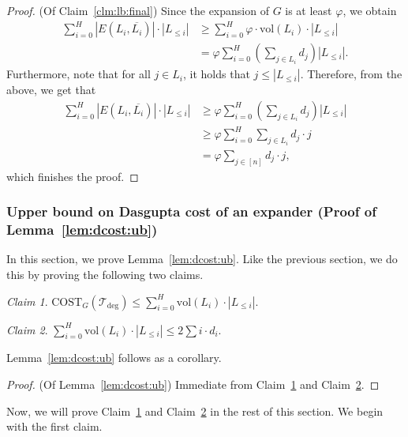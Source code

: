 \documentclass[letterpaper,11pt]{article}
\newcommand{\tdeg}{\mathcal{T}_{\deg}}
\newcommand{\CT}{\text{COST}}
\theoremstyle{plain}
\theoremstyle{definition}
\theoremstyle{remark}
\newtheorem{claim}{Claim}
\newcommand{\vol}{\text{vol}}
\begin{document}
\begin{proof} (Of Claim~\ref{clm:lb:final})
Since the expansion of $G$ is at least $\varphi$, we obtain
	\begin{align*}
		\sum_{i=0}^{H} |E(L_i, \overline{L_i})| \cdot |L_{\leq i}| &\geq \sum_{i=0}^{H} \varphi \cdot \vol(L_i) \cdot |L_{\leq i}| \\
		&=  \varphi \sum_{i=0}^{H} \left( \sum_{j \in L_i} d_j \right) |L_{\leq i}|.
	\end{align*}
Furthermore, note that for all $j \in L_i$, it holds that $j \leq |L_{\leq i}|$. Therefore, from the above, we get that
\begin{align*}
    \sum_{i=0}^{H} |E(L_i, \overline{L_i})| \cdot |L_{\leq i}| &\geq \varphi \sum_{i=0}^{H} \left( \sum_{j \in L_i} d_j \right) |L_{\leq i}|  \\
    & \geq \varphi \sum_{i=0}^H \sum_{j \in L_i}d_j \cdot j \\
    & = \varphi \sum_{j \in [n]} d_j \cdot j,
\end{align*}
	which finishes the proof.
\end{proof}


\subsubsection{Upper bound on Dasgupta cost of an expander (Proof of Lemma~\ref{lem:dcost:ub})}

In this section, we prove Lemma~\ref{lem:dcost:ub}. Like the previous section,
we do this by proving the following two claims.

\begin{claim} \label{clm:ub:aux}
	$\CT_G(\tdeg) \leq \sum_{i = 0}^{H} \vol(L_i) \cdot |L_{\leq i}|$.
\end{claim}


\begin{claim} \label{clm:ub:final}
	$\sum_{i = 0}^{H} \vol(L_i) \cdot |L_{\leq i}| \leq 2 \sum i \cdot d_i$.
\end{claim}

Lemma~\ref{lem:dcost:ub} follows as a corollary.

\begin{proof} (Of Lemma~\ref{lem:dcost:ub})
	Immediate from Claim~\ref{clm:ub:aux} and Claim~\ref{clm:ub:final}. 
\end{proof}

Now, we will prove Claim~\ref{clm:ub:aux} and Claim~\ref{clm:ub:final} in the rest of this
section. We begin with the first claim.
\end{document}

